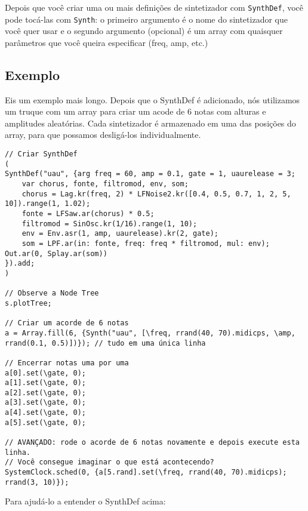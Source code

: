 Depois que você criar uma ou mais definições de sintetizador com \texttt{SynthDef}, você pode tocá-las com \texttt{Synth}: o primeiro argumento é o nome do sintetizador que você quer usar e o segundo argumento (opcional) é um array com quaisquer parâmetros que você queira especificar (freq, amp, etc.)

\subsection{Exemplo}

Eis um exemplo mais longo. Depois que o SynthDef é adicionado, nós utilizamos um truque com um array para criar um acode de 6 notas com alturas e amplitudes aleatórias. Cada sintetizador é armazenado em uma das posições do array, para que possamos desligá-los individualmente. 
 
\begin{lstlisting}[style=SuperCollider-IDE, basicstyle=\scttfamily\footnotesize]
// Criar SynthDef
(
SynthDef("uau", {arg freq = 60, amp = 0.1, gate = 1, uaurelease = 3;
	var chorus, fonte, filtromod, env, som;
	chorus = Lag.kr(freq, 2) * LFNoise2.kr([0.4, 0.5, 0.7, 1, 2, 5, 10]).range(1, 1.02);
	fonte = LFSaw.ar(chorus) * 0.5;
	filtromod = SinOsc.kr(1/16).range(1, 10);
	env = Env.asr(1, amp, uaurelease).kr(2, gate);
	som = LPF.ar(in: fonte, freq: freq * filtromod, mul: env);
Out.ar(0, Splay.ar(som))
}).add;
)

// Observe a Node Tree
s.plotTree;

// Criar um acorde de 6 notas
a = Array.fill(6, {Synth("uau", [\freq, rrand(40, 70).midicps, \amp, rrand(0.1, 0.5)])}); // tudo em uma única linha

// Encerrar notas uma por uma
a[0].set(\gate, 0);
a[1].set(\gate, 0);
a[2].set(\gate, 0);
a[3].set(\gate, 0);
a[4].set(\gate, 0);
a[5].set(\gate, 0);

// AVANÇADO: rode o acorde de 6 notas novamente e depois execute esta linha.
// Você consegue imaginar o que está acontecendo?
SystemClock.sched(0, {a[5.rand].set(\freq, rrand(40, 70).midicps); rrand(3, 10)});
\end{lstlisting}

Para ajudá-lo a entender o SynthDef acima:

